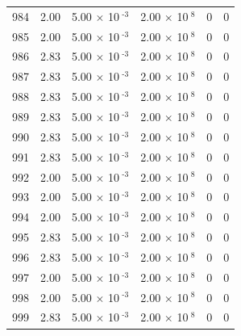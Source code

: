 \documentclass[a4paper,11pt]{article}
\begin{document}
\begin{center}
\begin{longtable}{|R{1.5cm}|R{2.4cm}|R{2.4cm}|R{2.4cm}|R{2.4cm}|R{2.4cm}|}
  984 &   2.00  &         5.00 $\times$ 10$^{\text{          -3}}$  &         2.00 $\times$ 10$^{\text{           8}}$  & 0  & 0 \\
  985 &   2.00  &         5.00 $\times$ 10$^{\text{          -3}}$  &         2.00 $\times$ 10$^{\text{           8}}$  & 0  & 0 \\
  986 &   2.83  &         5.00 $\times$ 10$^{\text{          -3}}$  &         2.00 $\times$ 10$^{\text{           8}}$  & 0  & 0 \\
  987 &   2.83  &         5.00 $\times$ 10$^{\text{          -3}}$  &         2.00 $\times$ 10$^{\text{           8}}$  & 0  & 0 \\
  988 &   2.83  &         5.00 $\times$ 10$^{\text{          -3}}$  &         2.00 $\times$ 10$^{\text{           8}}$  & 0  & 0 \\
  989 &   2.83  &         5.00 $\times$ 10$^{\text{          -3}}$  &         2.00 $\times$ 10$^{\text{           8}}$  & 0  & 0 \\
  990 &   2.83  &         5.00 $\times$ 10$^{\text{          -3}}$  &         2.00 $\times$ 10$^{\text{           8}}$  & 0  & 0 \\
  991 &   2.83  &         5.00 $\times$ 10$^{\text{          -3}}$  &         2.00 $\times$ 10$^{\text{           8}}$  & 0  & 0 \\
  992 &   2.00  &         5.00 $\times$ 10$^{\text{          -3}}$  &         2.00 $\times$ 10$^{\text{           8}}$  & 0  & 0 \\
  993 &   2.00  &         5.00 $\times$ 10$^{\text{          -3}}$  &         2.00 $\times$ 10$^{\text{           8}}$  & 0  & 0 \\
  994 &   2.00  &         5.00 $\times$ 10$^{\text{          -3}}$  &         2.00 $\times$ 10$^{\text{           8}}$  & 0  & 0 \\
  995 &   2.83  &         5.00 $\times$ 10$^{\text{          -3}}$  &         2.00 $\times$ 10$^{\text{           8}}$  & 0  & 0 \\
  996 &   2.83  &         5.00 $\times$ 10$^{\text{          -3}}$  &         2.00 $\times$ 10$^{\text{           8}}$  & 0  & 0 \\
  997 &   2.00  &         5.00 $\times$ 10$^{\text{          -3}}$  &         2.00 $\times$ 10$^{\text{           8}}$  & 0  & 0 \\
  998 &   2.00  &         5.00 $\times$ 10$^{\text{          -3}}$  &         2.00 $\times$ 10$^{\text{           8}}$  & 0  & 0 \\
  999 &   2.83  &         5.00 $\times$ 10$^{\text{          -3}}$  &         2.00 $\times$ 10$^{\text{           8}}$  & 0  & 0 \\

\end{longtable}
\end{center}
\end{document}
